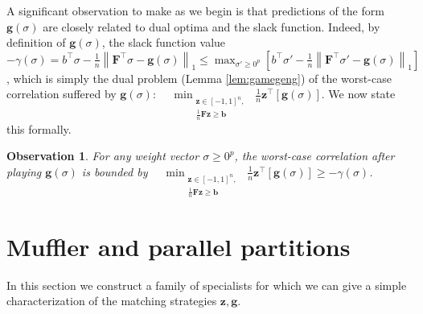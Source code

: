 \documentclass{colt2015} %
\newtheorem{obs}[thm]{Observation}
\newcommand{\vF}{\mathbf{F}}
\newcommand{\vb}{\mathbf{b}}
\newcommand{\vg}{\mathbf{g}}
\newcommand{\vz}{\mathbf{z}}
\newcommand{\vnorm}[1]{\left\lVert#1\right\rVert} %
\begin{document}
A significant observation to make as we begin 
is that predictions of the form $\vg (\sigma)$ 
are closely related to dual optima and the slack function. 
Indeed, by definition of $\vg (\sigma)$, the slack function value 
$ - \gamma (\sigma) = b^\top \sigma - \frac{1}{n} \vnorm{\vF^\top \sigma - \vg (\sigma)}_1 
\leq \max_{\sigma' \geq 0^p} \left[ b^\top \sigma' - \frac{1}{n} \vnorm{\vF^\top \sigma' - \vg (\sigma)}_1 \right]$, 
which is simply the dual problem (Lemma \ref{lem:gamegeng}) of the worst-case correlation suffered by $\vg (\sigma)$: 
$\displaystyle \quad \min_{\substack{ \vz \in [-1,1]^n , \\ \frac{1}{n} \vF \vz \geq \vb }} \;\frac{1}{n} \vz^\top [\vg (\sigma)]$. 
We now state this formally.
\begin{obs}
\label{obs:slacksubopt}
For any weight vector $\sigma \geq 0^p$, 
the worst-case correlation after playing $\vg (\sigma)$ is bounded by 
$\displaystyle \quad \min_{\substack{ \vz \in [-1,1]^n , \\ \frac{1}{n} \vF \vz \geq \vb }} \;\frac{1}{n} \vz^\top [\vg (\sigma)] 
\geq - \gamma (\sigma) $\;.
\end{obs}

\fi


\section{Muffler and parallel partitions}

In this section we construct a family of specialists for which we can
give a simple characterization of the matching strategies $\vz,\vg$.
\end{document}
